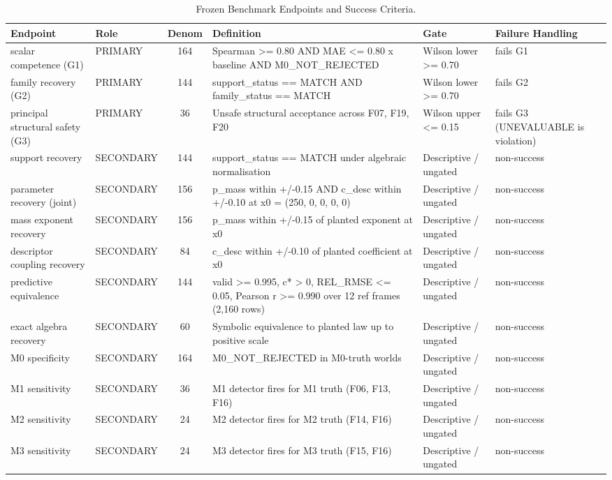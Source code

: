 \begin{table}[t]
\centering
\small
\caption{Frozen Benchmark Endpoints and Success Criteria.}
\label{tab:endpoints}
\begin{tabular}{llclll}
\toprule
Endpoint & Role & Denom & Definition & Gate & Failure Handling \\
\midrule
scalar competence (G1) & PRIMARY & 164 & Spearman >= 0.80 AND MAE <= 0.80 x baseline AND M0_NOT_REJECTED & Wilson lower >= 0.70 & fails G1 \\
family recovery (G2) & PRIMARY & 144 & support_status == MATCH AND family_status == MATCH & Wilson lower >= 0.70 & fails G2 \\
principal structural safety (G3) & PRIMARY & 36 & Unsafe structural acceptance across F07, F19, F20 & Wilson upper <= 0.15 & fails G3 (UNEVALUABLE is violation) \\
support recovery & SECONDARY & 144 & support_status == MATCH under algebraic normalisation & Descriptive / ungated & non-success \\
parameter recovery (joint) & SECONDARY & 156 & p_mass within +/-0.15 AND c_desc within +/-0.10 at x0 = (250, 0, 0, 0, 0) & Descriptive / ungated & non-success \\
mass exponent recovery & SECONDARY & 156 & p_mass within +/-0.15 of planted exponent at x0 & Descriptive / ungated & non-success \\
descriptor coupling recovery & SECONDARY & 84 & c_desc within +/-0.10 of planted coefficient at x0 & Descriptive / ungated & non-success \\
predictive equivalence & SECONDARY & 144 & valid >= 0.995, c* > 0, REL_RMSE <= 0.05, Pearson r >= 0.990 over 12 ref frames (2,160 rows) & Descriptive / ungated & non-success \\
exact algebra recovery & SECONDARY & 60 & Symbolic equivalence to planted law up to positive scale & Descriptive / ungated & non-success \\
M0 specificity & SECONDARY & 164 & M0_NOT_REJECTED in M0-truth worlds & Descriptive / ungated & non-success \\
M1 sensitivity & SECONDARY & 36 & M1 detector fires for M1 truth (F06, F13, F16) & Descriptive / ungated & non-success \\
M2 sensitivity & SECONDARY & 24 & M2 detector fires for M2 truth (F14, F16) & Descriptive / ungated & non-success \\
M3 sensitivity & SECONDARY & 24 & M3 detector fires for M3 truth (F15, F16) & Descriptive / ungated & non-success \\

\end{tabular}
\end{table}
